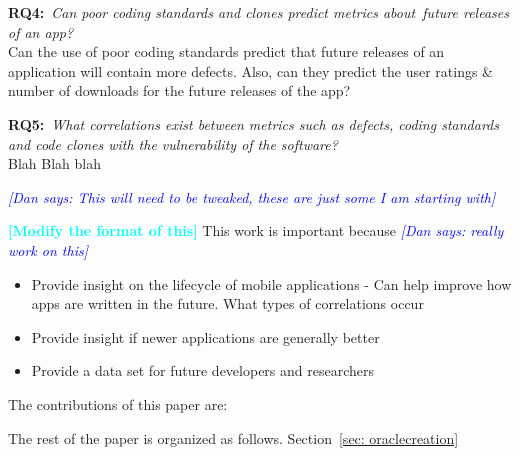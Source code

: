 \documentclass{sig-alternate}
\newcommand{\todo}[1]{\textcolor{cyan}{\textbf{[#1]}}}
\newcommand{\dan}[1]{\textcolor{blue}{{\it [Dan says: #1]}}}
\begin{document}


\textbf{RQ4:}~\emph{Can poor coding standards and clones predict metrics about~\emph{future} releases of an app?}\\
Can the use of poor coding standards predict that future releases of an application will contain more defects. Also, can they predict the user ratings \& number of downloads for the future releases of the app?


\textbf{RQ5:}~\emph{What correlations exist between metrics such as defects, coding standards and code clones with the vulnerability of the software?}\\
Blah Blah blah









\dan{This will need to be tweaked, these are just some I am starting with}

\todo{Modify the format of this}
This work is important because  \dan{really work on this}

\begin{itemize}
  \item Provide insight on the lifecycle of mobile applications - Can help improve how apps are written in the future. What types of correlations occur
  \item Provide insight if newer applications are generally better
  \item Provide a data set for future developers and researchers
\end{itemize}

The contributions of this paper are:



The rest of the paper is organized as follows. Section~\ref{sec: oraclecreation}
\end{document}
